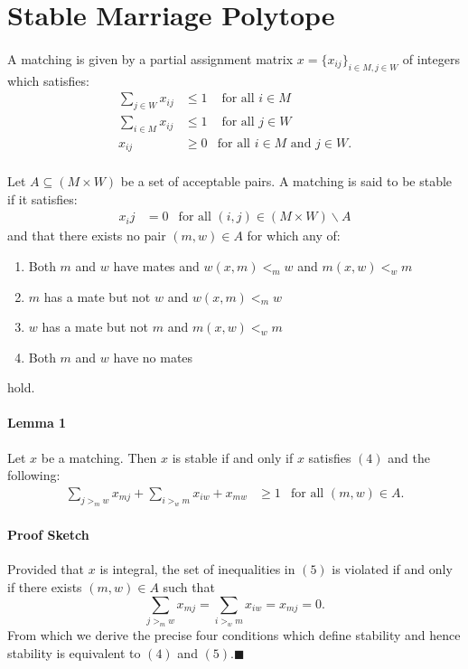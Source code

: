 \documentclass[letterpaper,12pt,oneside,onecolumn]{article}
\begin{document}
\section{Stable Marriage Polytope}
\paragraph{}
A matching is given by a partial assignment matrix $x = \{x_{ij}\}_{i\in M, j\in W}$ of integers which satisfies:
\begin{align}
\sum_{j \in W} x_{ij} &\leq 1 &\text{ for all $i \in M$}\\
\sum_{i \in M} x_{ij} &\leq 1 &\text{ for all $j \in W$}\\
x_{ij} &\geq 0 &\text{for all $i \in M$ and $j \in W$}.
\end{align}
\paragraph{}
Let $A \subseteq (M \times W)$ be a set of acceptable pairs. A matching is said to be stable if it satisfies:
\begin{align}
x_ij &= 0 &\text{for all $(i,j) \in (M\times W)\backslash A$}
\end{align}
and that there exists no pair $(m,w) \in A$ for which any of:
\begin{enumerate}
\item Both $m$ and $w$ have mates and $w(x,m) <_m w$ and $m(x,w) <_w m$ \\
\item $m$ has a mate but not $w$ and $w(x,m) <_m w$\\
\item $w$ has a mate but not $m$ and $m(x,w) <_w m$\\
\item Both $m$ and $w$ have no mates
\end{enumerate}
hold.
\paragraph{Lemma 1}
Let $x$ be a matching. Then $x$ is stable if and only if $x$ satisfies $(4)$ and the following:
\begin{align}
\sum_{j>_m w} x_{mj} + \sum_{i >_w m} x_{iw} + x_{mw} &\geq 1 &\text{for all $(m,w)\in A$}.
\end{align}
\paragraph{Proof Sketch}
Provided that $x$ is integral, the set of inequalities in $(5)$ is violated if and only if there exists $(m,w) \in A$ such that $$ \sum_{j >_m w} x_{mj} = \sum_{i >_w m} x_{iw} = x_{mj} = 0. $$ From which we derive the precise four conditions which define stability and hence stability is equivalent to $(4)$ and $(5)$.$\blacksquare$
\end{document}
